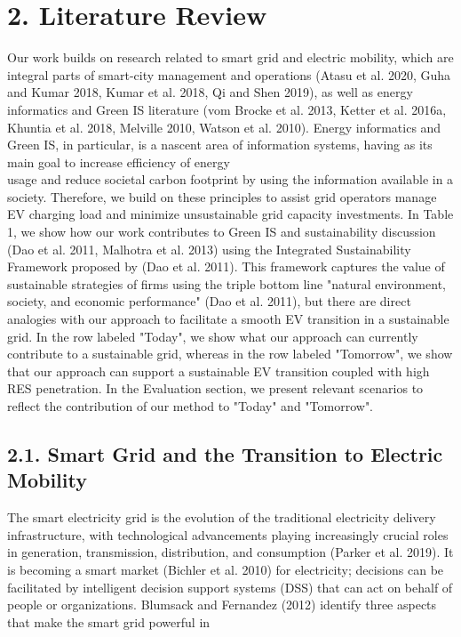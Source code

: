 \documentclass[10pt]{article}
\begin{document}
\section*{2. Literature Review}
Our work builds on research related to smart grid and electric mobility, which are integral parts of smart-city management and operations (Atasu et al. 2020, Guha and Kumar 2018, Kumar et al. 2018, Qi and Shen 2019), as well as energy informatics and Green IS literature (vom Brocke et al. 2013, Ketter et al. 2016a, Khuntia et al. 2018, Melville 2010, Watson et al. 2010). Energy informatics and Green IS, in particular, is a nascent area of information systems, having as its main goal to increase efficiency of energy\\
usage and reduce societal carbon footprint by using the information available in a society. Therefore, we build on these principles to assist grid operators manage EV charging load and minimize unsustainable grid capacity investments. In Table 1, we show how our work contributes to Green IS and sustainability discussion (Dao et al. 2011, Malhotra et al. 2013) using the Integrated Sustainability Framework proposed by (Dao et al. 2011). This framework captures the value of sustainable strategies of firms using the triple bottom line "natural environment, society, and economic performance" (Dao et al. 2011), but there are direct analogies with our approach to facilitate a smooth EV transition in a sustainable grid. In the row labeled "Today", we show what our approach can currently contribute to a sustainable grid, whereas in the row labeled "Tomorrow", we show that our approach can support a sustainable EV transition coupled with high RES penetration. In the Evaluation section, we present relevant scenarios to reflect the contribution of our method to "Today" and "Tomorrow".

\subsection*{2.1. Smart Grid and the Transition to Electric Mobility}
The smart electricity grid is the evolution of the traditional electricity delivery infrastructure, with technological advancements playing increasingly crucial roles in generation, transmission, distribution, and consumption (Parker et al. 2019). It is becoming a smart market (Bichler et al. 2010) for electricity; decisions can be facilitated by intelligent decision support systems (DSS) that can act on behalf of people or organizations. Blumsack and Fernandez (2012) identify three aspects that make the smart grid powerful in
\end{document}
